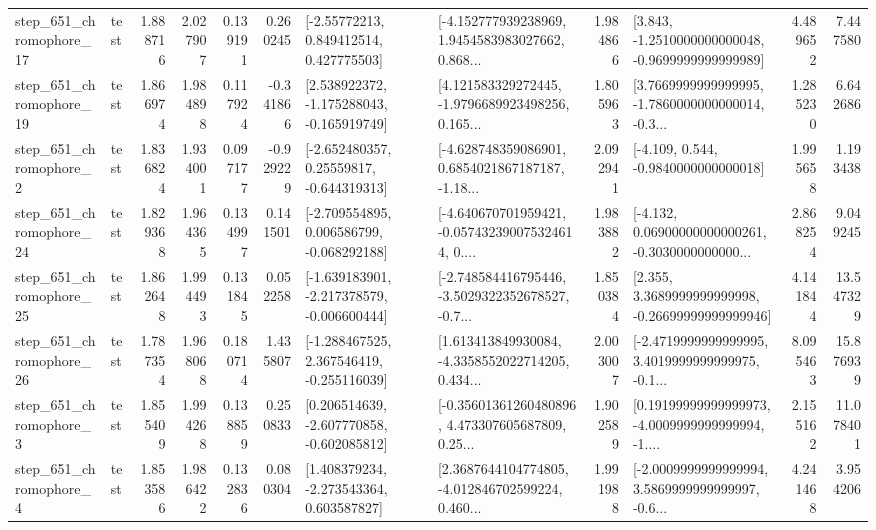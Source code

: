 \begin{tabular}{llrrrrllrlrr}
  step\_651\_chromophore\_17 &      test &      1.888716 &    2.027907 &      0.139191 &  0.260245 &     [-2.55772213, 0.849412514, 0.427775503] &  [-4.152777939238969, 1.9454583983027662, 0.868... &       1.984866 &  [3.843, -1.2510000000000048, -0.9699999999999989] &            4.489652 &          7.447580 \\
  step\_651\_chromophore\_19 &      test &      1.866974 &    1.984898 &      0.117924 & -0.341866 &   [2.538922372, -1.175288043, -0.165919749] &  [4.121583329272445, -1.9796689923498256, 0.165... &       1.805963 &  [3.7669999999999995, -1.7860000000000014, -0.3... &            1.285230 &          6.642686 \\
   step\_651\_chromophore\_2 &      test &      1.836824 &    1.934001 &      0.097177 & -0.929229 &    [-2.652480357, 0.25559817, -0.644319313] &  [-4.628748359086901, 0.6854021867187187, -1.18... &       2.092941 &               [-4.109, 0.544, -0.9840000000000018] &            1.995658 &          1.193438 \\
  step\_651\_chromophore\_24 &      test &      1.829368 &    1.964365 &      0.134997 &  0.141501 &   [-2.709554895, 0.006586799, -0.068292188] &  [-4.640670701959421, -0.057432390075324614, 0.... &       1.983882 &  [-4.132, 0.06900000000000261, -0.3030000000000... &            2.868254 &          9.049245 \\
  step\_651\_chromophore\_25 &      test &      1.862648 &    1.994493 &      0.131845 &  0.052258 &  [-1.639183901, -2.217378579, -0.006600444] &  [-2.748584416795446, -3.5029322352678527, -0.7... &       1.850384 &  [2.355, 3.3689999999999998, -0.26699999999999946] &            4.141844 &         13.547329 \\
  step\_651\_chromophore\_26 &      test &      1.787354 &    1.968068 &      0.180714 &  1.435807 &   [-1.288467525, 2.367546419, -0.255116039] &  [1.613413849930084, -4.3358552022714205, 0.434... &       2.003007 &  [-2.4719999999999995, 3.4019999999999975, -0.1... &            8.095463 &         15.876939 \\
   step\_651\_chromophore\_3 &      test &      1.855409 &    1.994268 &      0.138859 &  0.250833 &   [0.206514639, -2.607770858, -0.602085812] &  [-0.35601361260480896, 4.473307605687809, 0.25... &       1.902589 &  [0.19199999999999973, -4.0009999999999994, -1.... &            2.155162 &         11.078401 \\
   step\_651\_chromophore\_4 &      test &      1.853586 &    1.986422 &      0.132836 &  0.080304 &    [1.408379234, -2.273543364, 0.603587827] &  [2.3687644104774805, -4.012846702599224, 0.460... &       1.991988 &  [-2.0009999999999994, 3.5869999999999997, -0.6... &            4.241468 &          3.954206 \\

\end{tabular}
